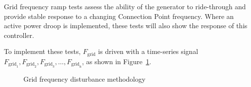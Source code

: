 Grid frequency ramp tests assess the ability of the generator to ride-through and provide stable response to a changing Connection Point frequency. Where an active power droop is implemented, these tests will also show the response of this controller.

To implement these tests, $F_{\mathrm{grid}}$ is driven with a time-series signal $F_{\mathrm{grid}_{\mathrm{1}}}, F_{\mathrm{grid}_{\mathrm{2}}}, F_{\mathrm{grid}_{\mathrm{3}}}, \dots, F_{\mathrm{grid}_{\mathrm{n}}}$, as shown in Figure~\ref{fig:smib-fgrid-disturbance-methodology}.


\begin{figure}[h]
	\centering
	
	\caption{Grid frequency disturbance methodology}
	\label{fig:smib-fgrid-disturbance-methodology}
\end{figure}